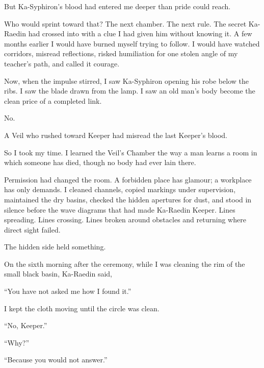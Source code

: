 But Ka-Syphiron's blood had entered me deeper than pride could reach.\par

Who would sprint toward that? The next chamber. The next rule. The secret Ka-Raedin had crossed into with a clue I had given him without knowing it. A few months earlier I would have burned myself trying to follow. I would have watched corridors, misread reflections, risked humiliation for one stolen angle of my teacher's path, and called it courage.\par

Now, when the impulse stirred, I saw Ka-Syphiron opening his robe below the ribs. I saw the blade drawn from the lamp. I saw an old man's body become the clean price of a completed link.\par

No.\par

A Veil who rushed toward Keeper had misread the last Keeper's blood.\par

So I took my time. I learned the Veil's Chamber the way a man learns a room in which someone has died, though no body had ever lain there.\par

Permission had changed the room. A forbidden place has glamour; a workplace has only demands. I cleaned channels, copied markings under supervision, maintained the dry basins, checked the hidden apertures for dust, and stood in silence before the wave diagrams that had made Ka-Raedin Keeper. Lines spreading. Lines crossing. Lines broken around obstacles and returning where direct sight failed.\par

The hidden side held something.\par

On the sixth morning after the ceremony, while I was cleaning the rim of the small black basin, Ka-Raedin said,\par

``You have not asked me how I found it.''\par

I kept the cloth moving until the circle was clean.\par

``No, Keeper.''\par

``Why?''\par

``Because you would not answer.''\par

